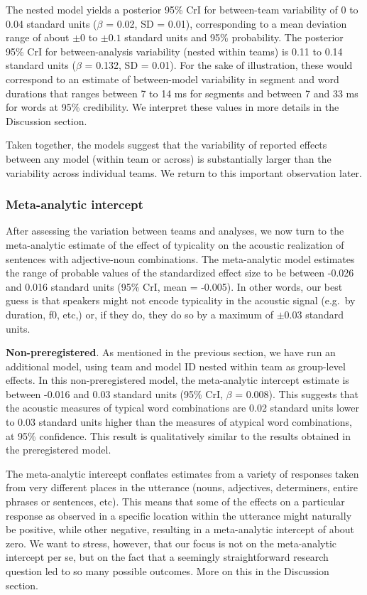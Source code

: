 \documentclass[Review,times,sageh]{sagej}
\begin{document}
The nested model yields a posterior 95\% CrI for between-team variability of 0 to 0.04 standard units (\(\beta\) = 0.02, SD = 0.01), corresponding to a mean deviation range of about \(\pm 0\) to \(\pm 0.1\) standard units and 95\% probability.
The posterior 95\% CrI for between-analysis variability (nested within teams) is 0.11 to 0.14 standard units (\(\beta\) = 0.132, SD = 0.01).
For the sake of illustration, these would correspond to an estimate of between-model variability in segment and word durations that ranges between 7 to 14 ms for segments and between 7 and 33 ms for words at 95\% credibility.
We interpret these values in more details in the Discussion section.

Taken together, the models suggest that the variability of reported effects between any model (within team or across) is substantially larger than the variability across individual teams.
We return to this important observation later.

\hypertarget{meta-analytic-intercept}{%
\subsubsection{Meta-analytic intercept}\label{meta-analytic-intercept}}

After assessing the variation between teams and analyses, we now turn to the meta-analytic estimate of the effect of typicality on the acoustic realization of sentences with adjective-noun combinations.
The meta-analytic model estimates the range of probable values of the standardized effect size to be between -0.026 and 0.016 standard units (95\% CrI, mean = -0.005).
In other words, our best guess is that speakers might not encode typicality in the acoustic signal (e.g.~by duration, f0, etc,) or, if they do, they do so by a maximum of \(\pm 0.03\) standard units.

\textbf{Non-preregistered}. As mentioned in the previous section, we have run an additional model, using team and model ID nested within team as group-level effects.
In this non-preregistered model, the meta-analytic intercept estimate is between -0.016 and 0.03 standard units (95\% CrI, \(\beta\) = 0.008).
This suggests that the acoustic measures of typical word combinations are 0.02 standard units lower to 0.03 standard units higher than the measures of atypical word combinations, at 95\% confidence.
This result is qualitatively similar to the results obtained in the preregistered model.

The meta-analytic intercept conflates estimates from a variety of responses taken from very different places in the utterance (nouns, adjectives, determiners, entire phrases or sentences, etc).
This means that some of the effects on a particular response as observed in a specific location within the utterance might naturally be positive, while other negative, resulting in a meta-analytic intercept of about zero.
We want to stress, however, that our focus is not on the meta-analytic intercept per se, but on the fact that a seemingly straightforward research question led to so many possible outcomes.
More on this in the Discussion section.
\end{document}
